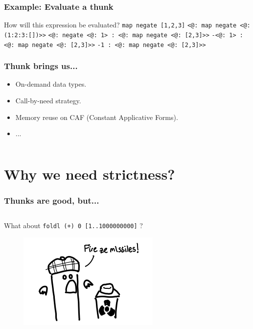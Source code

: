 \documentclass{beamer}
\begin{document}

\begin{frame}
\frametitle{Example: Evaluate a thunk}
How will this expression be evaluated?\newline\bigskip
\texttt{map negate [1,2,3]}\newline\bigskip\pause
\texttt{<@: map negate <@: (1:2:3:[])>>}\newline\bigskip\pause
\texttt{<@: negate <@: 1> : <@: map negate <@: [2,3]>>}\newline\bigskip\pause
\texttt{-<@: 1> : <@: map negate <@: [2,3]>>}\newline\bigskip\pause
\texttt{-1 : <@: map negate <@: [2,3]>>}
\end{frame}


\begin{frame}
\frametitle{Thunk brings us...}
\begin{itemize}
    \item On-demand data types.
    \item Call-by-need strategy.
    \item Memory reuse on CAF (Constant Applicative Forms).
    \item ...
\end{itemize}\bigskip
\inputminted{haskell}{src/fibs.hs}
\end{frame}


\section{Why we need strictness?}

\begin{frame}
\frametitle{Thunks are good, but...}
\inputminted{haskell}{src/lazy-foldl.hs}\bigskip
What about \texttt{foldl (+) 0 [1..1000000000]} ?\newline
\begin{figure}[hbt!]
    \centering
    \includegraphics[height=0.4\textheight]{./pic/evil-of-thunk.png}
\end{figure}
\end{frame}
\end{document}
